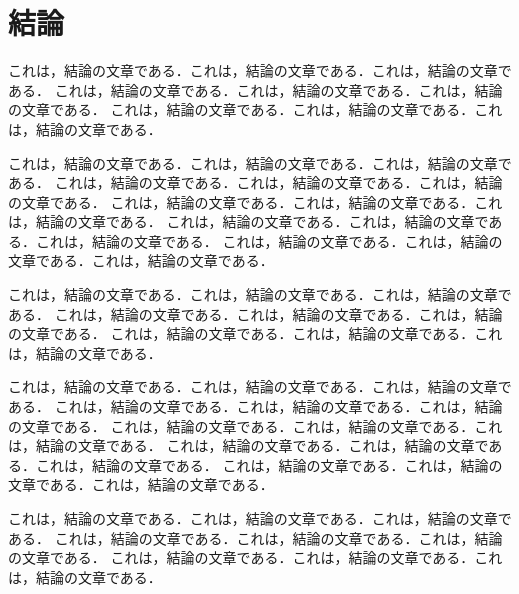 \chapter{結論}

これは，結論の文章である．これは，結論の文章である．これは，結論の文章である．
これは，結論の文章である．これは，結論の文章である．これは，結論の文章である．
これは，結論の文章である．これは，結論の文章である．これは，結論の文章である．

これは，結論の文章である．これは，結論の文章である．これは，結論の文章である．
これは，結論の文章である．これは，結論の文章である．これは，結論の文章である．
これは，結論の文章である．これは，結論の文章である．これは，結論の文章である．
これは，結論の文章である．これは，結論の文章である．これは，結論の文章である．
これは，結論の文章である．これは，結論の文章である．これは，結論の文章である．

これは，結論の文章である．これは，結論の文章である．これは，結論の文章である．
これは，結論の文章である．これは，結論の文章である．これは，結論の文章である．
これは，結論の文章である．これは，結論の文章である．これは，結論の文章である．

これは，結論の文章である．これは，結論の文章である．これは，結論の文章である．
これは，結論の文章である．これは，結論の文章である．これは，結論の文章である．
これは，結論の文章である．これは，結論の文章である．これは，結論の文章である．
これは，結論の文章である．これは，結論の文章である．これは，結論の文章である．
これは，結論の文章である．これは，結論の文章である．これは，結論の文章である．

これは，結論の文章である．これは，結論の文章である．これは，結論の文章である．
これは，結論の文章である．これは，結論の文章である．これは，結論の文章である．
これは，結論の文章である．これは，結論の文章である．これは，結論の文章である．
